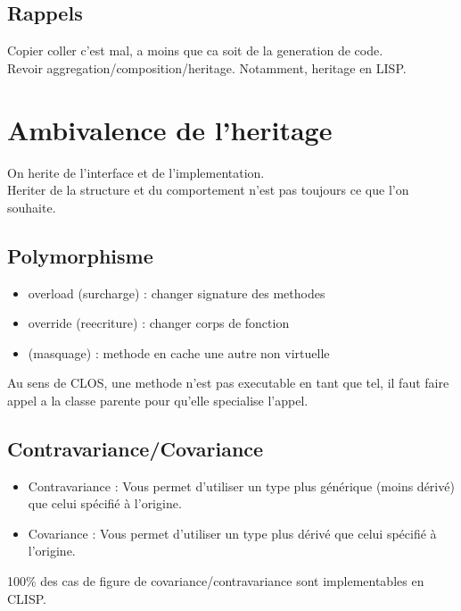 \documentclass[a4paper,11pt]{article}
\begin{document}
\subsection{Rappels}
Copier coller c'est mal, a moins que ca soit de la generation de code.\\
Revoir aggregation/composition/heritage. Notamment, heritage en LISP.\\
 
\section{Ambivalence de l'heritage}
On herite de l'interface et de l'implementation.\\
Heriter de la structure et du comportement n'est pas toujours ce que l'on souhaite.\\

\subsection{Polymorphisme}
\begin{itemize}
  \item overload (surcharge) : changer signature des methodes
  \item override (reecriture) : changer corps de fonction
  \item (masquage) : methode en cache une autre non virtuelle
\end{itemize}

Au sens de CLOS, une methode n'est pas executable en tant que tel, il faut
faire appel a la classe parente pour qu'elle specialise l'appel.\\

\subsection{Contravariance/Covariance}
\begin{itemize}
  \item Contravariance :  Vous permet d'utiliser un type plus générique (moins dérivé) que celui spécifié à l'origine.
  \item Covariance : Vous permet d'utiliser un type plus dérivé que celui spécifié à l'origine. 
\end{itemize}

100\% des cas de figure de covariance/contravariance sont implementables en CLISP.
\end{document}
